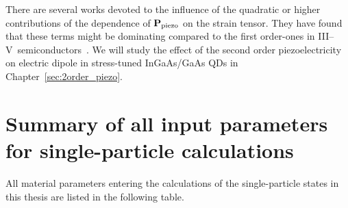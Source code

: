 There are several works devoted to the influence of the quadratic or higher contributions of the dependence of $\mathbf{P}_{{\rm piezo}}$ on the strain tensor. They have found that these terms might be dominating compared to the first order-ones in III--V~semiconductors~\citep{Bester,Bester:06,Beya-Wakata2011}. We will study the effect of the second order piezoelectricity on electric dipole in stress-tuned InGaAs/GaAs QDs in Chapter~\ref{sec:2order_piezo}.














\section{Summary of all input parameters for single-particle calculations}
\label{Secsumparam}

All material parameters entering the calculations of the single-particle states in this thesis are listed in the following table.

